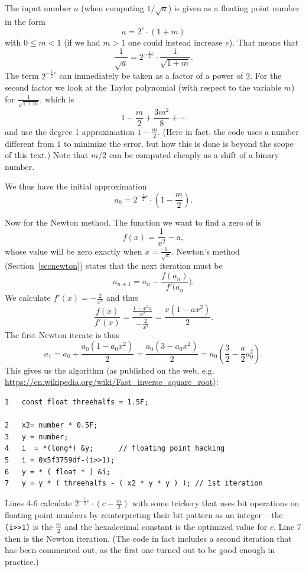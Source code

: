 \begin{bsp}
The input number $a$ (when computing $1/\sqrt{a}$)
is given as a floating point number in the form
\[
a=2^e\cdot(1+m)
\]
with $0\le m<1$ (if we had $m>1$ one could instead increase $e$).
That means that
\[
\frac{1}{\sqrt{a}}=2^{-\frac12e}\cdot\frac{1}{\sqrt{1+m}}.
\]
The term $2^{-\frac12e}$ can immediately be taken as a factor of a power of
$2$. For the second factor we look at the Taylor polynomial (with respect to
the variable $m$) for $\frac{1}{\sqrt{1+m}}$, which is 
\[
1-\frac{m}{2}+\frac{3m^2}{8}+\cdots
\]
and use the degree 1 approximation $1-\frac{m}{2}$. (Here in fact, the
code uses a number different from $1$ to minimize the error, but
how this is done is beyond the scope of this text.) Note that $m/2$ can be
computed cheaply as a shift of a binary number.

We thus have the initial approximation 
\[
a_0=2^{-\frac12e}\cdot\left(1-\frac{m}2\right).
\]

Now for the Newton method. The function we want to find a zero of is 
\[
f(x)=\frac{1}{x^2}-a,
\]
whose value will be zero exactly when
$x=\frac1{\sqrt{x}}$. Newton's method (Section~\ref{secnewton}) states that
the next iteration must be
\[
a_{n+1}=a_n-\frac{f(a_n)}{f'(a_n}).
\]
We calculate $f'(x)=-\frac{2}{x^3}$ and thus
\[
\frac{f(x)}{f'(x)}=\frac{\frac{1-x^2a}{x^2}}{-\frac{2}{x^3}}
=\frac{x(1-ax^2)}{2}.
\]
The first Newton iterate is thus
\[
a_1=a_0+\frac{a_0(1-a_0x^2)}{2}
=\frac{a_0(3-a_0x^2)}{2}=a_0\left(\frac{3}{2}-\frac{a}{2}a_0^2\right).
\]
This gives us the algorithm (as published on the web, e.g.
\url{https://en.wikipedia.org/wiki/Fast_inverse_square_root}):
\begin{verbatim}
1   const float threehalfs = 1.5F;

2   x2= number * 0.5F;
3   y = number;
4   i  = *(long*) &y;      // floating point hacking
5   i = 0x5f3759df-(i>>1); 
6   y = * ( float * ) &i;
7   y = y * ( threehalfs - ( x2 * y * y ) ); // 1st iteration
\end{verbatim}
Lines 4-6 calculate $2^{-\frac12e}\cdot\left(c-\frac{m}2\right)$ with some
trickery that uses bit operations on floating point numbers by reinterpreting
their bit pattern as an integer -- the
\texttt{(i>>1)} is the $\frac{m}{2}$ and the hexadecimal constant is the
optimized value for $c$.
Line 7 then is the Newton iteration. (The code in fact includes a second
iteration that has been commented out, as the first one turned out to be good
enough in practice.)
\end{bsp}

